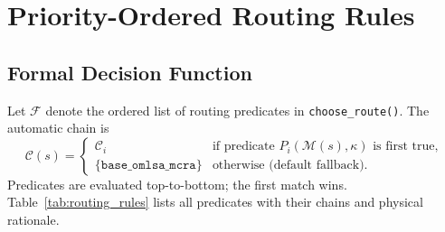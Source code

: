 \section{Priority-Ordered Routing Rules}
\label{sec:routing_rules}

\subsection{Formal Decision Function}

Let $\mathcal{F}$ denote the ordered list of routing predicates in \texttt{choose\_route()}. The automatic chain is
\begin{equation}
  \mathcal{C}(s) =
  \begin{cases}
    \mathcal{C}_i & \text{if predicate } P_i(\mathcal{M}(s),\kappa)\text{ is first true}, \\
    \{\texttt{base\_omlsa\_mcra}\} & \text{otherwise (default fallback)}.
  \end{cases}
\end{equation}
Predicates are evaluated top-to-bottom; the first match wins. Table~\ref{tab:routing_rules} lists all predicates with their chains and physical rationale.

